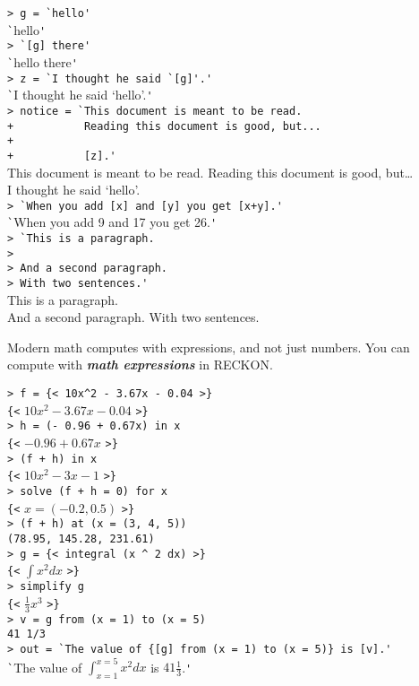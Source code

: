 \documentclass[12pt]{article}
\newcommand{\skey}[2]{{\bf \em #1#2}\index{#1}}
\newenvironment{indpar}[1][0.3in]%
	{\begin{list}{}%
		     {\setlength{\itemsep}{0in}%
		      \setlength{\topsep}{0in}%
		      \setlength{\parsep}{1ex}%
		      \setlength{\labelwidth}{#1}%
		      \setlength{\leftmargin}{#1}%
		      \addtolength{\leftmargin}{\labelsep}}%
	 \item}%
	{\end{list}}
\begin{document}
\begin{indpar}
\verb|> g = `hello'| \\
\verb|`|hello\verb|'| \\
\verb|> `[g] there'| \\
\verb|`|hello there\verb|'| \\
\verb|> z = `I thought he said `[g]'.'| \\
\verb|`|I thought he said `hello'.\verb|'| \\
\verb/> notice = `This document is meant to be read./ \\
\verb/+           Reading this document is good, but.../ \\
\verb/+           / \\
\verb/+           [z].'/ \\
This document is meant to be read.  Reading this document is good, but\ldots
\\[2ex]
I thought he said `hello'. \\
\verb|> `When you add [x] and [y] you get [x+y].'| \\
\verb|`|When you add 9 and 17 you get 26.\verb|'| \\
\verb|> `This is a paragraph.| \\
\verb|> | \\
\verb|> And a second paragraph.| \\
\verb|> With two sentences.'| \\
This is a paragraph. \\[2ex]
And a second paragraph. With two sentences.
\end{indpar}

Modern math computes with expressions, and not just numbers.
You can compute with \skey{math expression}s in RECKON.

\begin{indpar}
\verb/> f = {< 10x^2 - 3.67x - 0.04 >}/ \\
\verb/{</ $10x^2-3.67x-0.04$ \verb/>}/ \\
\verb/> h = (- 0.96 + 0.67x) in x/ \\
\verb/{</ $-0.96+0.67x$ \verb/>}/ \\
\verb/> (f + h) in x/ \\
\verb/{</ $10x^2-3x-1$ \verb/>}/ \\
\verb/> solve (f + h = 0) for x/ \\
\verb/{</ $x = (-0.2, 0.5)$ \verb/>}/ \\
\verb/> (f + h) at (x = (3, 4, 5))/ \\
\verb/(78.95, 145.28, 231.61)/ \\
\verb/> g = {< integral (x ^ 2 dx) >}/ \\
\verb/{</ $\int x^2 dx$ \verb/>}/ \\
\verb/> simplify g/ \\
\verb/{</ $\frac{1}{3} x^3$ \verb/>}/ \\
\verb/> v = g from (x = 1) to (x = 5)/ \\
\verb:41 1/3: \\
\verb/> out = `The value of {[g] from (x = 1) to (x = 5)} is [v].'/ \\
\verb/`/The value of $\int_{x = 1}^{x = 5} x^2 dx$ is $41\frac{1}{3}$.\verb/'/
\end{indpar}
\end{document}

